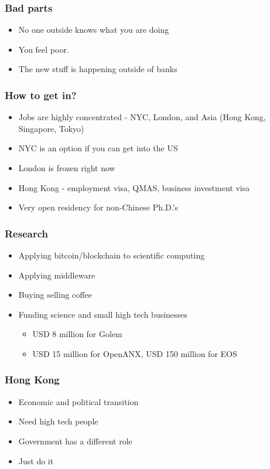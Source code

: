 \documentclass{beamer}
\begin{document}
\begin{frame}\frametitle{Bad parts}
  \begin{itemize}
\item No one outside knows what you are doing
\item You feel poor.
\item The new stuff is happening outside of banks
  \end{itemize}
\end{frame}

\begin{frame}\frametitle{How to get in?}
  \begin{itemize}
\item Jobs are highly concentrated - NYC, London, and Asia (Hong
    Kong, Singapore, Tokyo)
  \item NYC is an option if you can get into the US
  \item London is frozen right now
  \item Hong Kong - employment visa, QMAS, business investment visa
  \item Very open residency for non-Chinese Ph.D.'s
  \end{itemize}
\end{frame}

\begin{frame}\frametitle{Research}
  \begin{itemize}
\item Applying bitcoin/blockchain to scientific computing
\item Applying middleware
\item Buying selling coffee
\item Funding science and small high tech businesses
  \begin{itemize}
  \item USD 8 million for Golem
  \item USD 15 million for OpenANX, USD 150 million for EOS
    \end{itemize}
  \end{itemize}
\end{frame}

\begin{frame}\frametitle{Hong Kong}
  \begin{itemize}
\item Economic and political transition
\item Need high tech people
\item Government has a different role
\item Just do it
  \end{itemize}
\end{frame}
\end{document}
